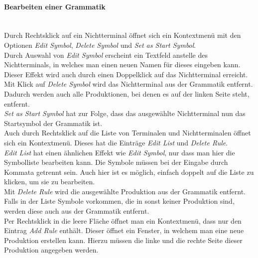 \paragraph{Bearbeiten einer Grammatik}\ \\
Durch Rechtsklick auf ein Nichtterminal öffnet sich ein Kontextmenü mit den Optionen \textit{Edit Symbol}, \textit{Delete Symbol} und \textit{Set as Start Symbol}.\\
Durch Auswahl von \textit{Edit Symbol} erscheint ein Textfeld anstelle des Nichtterminals, in welches man einen neuen Namen für dieses eingeben kann. Dieser Effekt wird auch durch einen Doppelklick auf das Nichtterminal erreicht.\\
Mit Klick auf \textit{Delete Symbol} wird das Nichtterminal aus der Grammatik entfernt. Dadurch werden auch alle Produktionen, bei denen es auf der linken Seite steht, entfernt.\\
\textit{Set as Start Symbol} hat zur Folge, dass das ausgewählte Nichtterminal nun das Startsymbol der Grammatik ist.\\
Auch durch Rechtsklick auf die Liste von Terminalen und Nichtterminalen öffnet sich ein Kontextmenü. Dieses hat die Einträge \textit{Edit List} und \textit{Delete Rule}.\\
\textit{Edit List} hat einen ähnlichen Effekt wie \textit{Edit Symbol}, nur dass man hier die Symbolliste bearbeiten kann. Die Symbole müssen bei der Eingabe durch Kommata getrennt sein. Auch hier ist es möglich, einfach doppelt auf die Liste zu klicken, um sie zu bearbeiten.\\
Mit \textit{Delete Rule} wird die ausgewählte Produktion aus der Grammatik entfernt. Falls in der Liste Symbole vorkommen, die in sonst keiner Produktion sind, werden diese auch aus der Grammatik entfernt.\\
Per Rechtsklick in die leere Fläche öffnet man ein Kontextmenü, dass nur den Eintrag \textit{Add Rule} enthält. Dieser öffnet ein Fenster, in welchem man eine neue Produktion erstellen kann. Hierzu müssen die linke und die rechte Seite dieser Produktion angegeben werden.
\newpage
